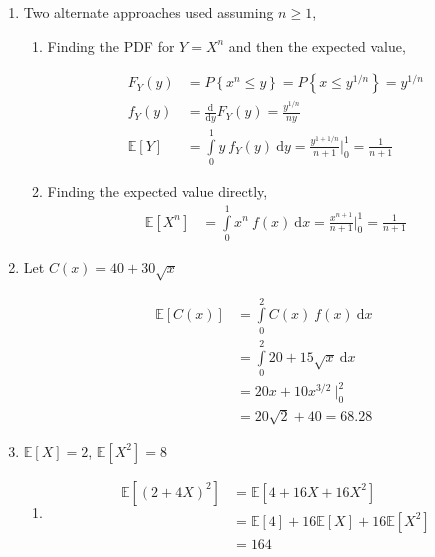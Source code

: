 \begin{enumerate}
\begin{enumerate}
		\end{enumerate}
	
	
	\item Two alternate approaches used assuming $ n \geq 1 $,
	
		\begin{enumerate}
			
			\item Finding the PDF for $ Y = X^n $ and then the expected value,
			
			\begin{align}
				F_Y (y) &= P \left\{x^n \leq y\right\} = P \left\{x \leq y^{1/n}\right\} = y^{1/n} \\
				f_Y (y)&= \frac{\mathrm{d}}{\mathrm{d} y} F_Y (y) = \frac{y^{1/n}}{ny} \\
				\mathbb{E}[Y] &= \int\limits_{0}^{1} y\ f_Y (y)\ \mathrm{d}y = \frac{y^{1 + 1/n}}{n + 1} \Big|_0^1 = \frac{1}{n+1}
			\end{align}
			\item Finding the expected value directly,
			\begin{align}
				\mathbb{E}[X^n] &= \int\limits_{0}^{1} x^n\ f(x)\ \mathrm{d}x = \frac{x^{n+1}}{n+1} \Big|_0^1 = \frac{1}{n+1}
			\end{align}
			
		\end{enumerate}
	
	
	\item Let $ C(x) = 40 + 30 \sqrt{x} $
	
		\begin{align}
			\mathbb{E}[C(x)] &= \int\limits_{0}^{2} C(x)\ f(x)\ \mathrm{d}x \nonumber \\
			&= \int\limits_{0}^{2} 20 + 15 \sqrt{x}\ \mathrm{d}x \nonumber \\
			&= 20x + 10 x^{3/2} \ \Big|_0^2 \nonumber \\
			&= 20\sqrt{2} + 40 = 68.28
		\end{align}
	
	
	\item $ \mathbb{E}[X] = 2 $, $ \mathbb{E}[X^2] = 8 $ \\
	
		\begin{enumerate}
			
			\item \begin{align}
				\mathbb{E}[(2 + 4X)^2] &= \mathbb{E}[4 + 16X + 16X^2] \nonumber \\
				&= \mathbb{E}[4] + 16\mathbb{E}[X] + 16 \mathbb{E}[X^2] \nonumber \\
				&= 164
			\end{align}
			

\end{enumerate}
\end{enumerate}
